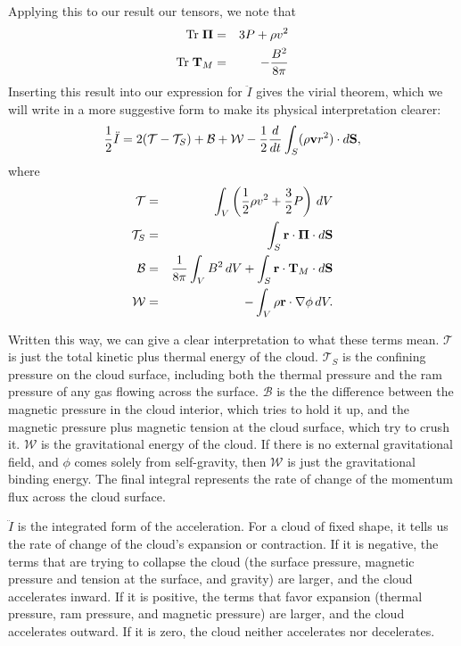 Applying this to our result our tensors, we note that
\begin{eqnarray}
\mbox{Tr}\; \boldsymbol{\Pi} & = & 3P + \rho v^2 \\
\mbox{Tr}\; \mathbf{T}_M & = & -\frac{B^2}{8\pi}
\end{eqnarray}
Inserting this result into our expression for $\ddot{I}$ gives the virial theorem, which we will write in a more suggestive form to make its physical interpretation clearer:
\begin{equation}
\frac{1}{2}\ddot{I} = 2(\mathcal{T} - \mathcal{T}_S) + \mathcal{B} + \mathcal{W} - \frac{1}{2}\frac{d}{dt} \int_S (\rho\mathbf{v} r^2)\cdot d\mathbf{S},
\end{equation}
where
\begin{eqnarray}
\mathcal{T} & = & \int_V\left(\frac{1}{2}\rho v^2 + \frac{3}{2} P\right)\, dV \\
\mathcal{T}_S & = & \int_S \mathbf{r} \cdot \boldsymbol{\Pi} \cdot d\mathbf{S}\\
\mathcal{B} & = & \frac{1}{8\pi} \int_V B^2 \,dV + \int_S \mathbf{r}\cdot \mathbf{T}_M\cdot d\mathbf{S}\\
\mathcal{W} & = & -\int_V \rho \mathbf{r}\cdot\nabla\phi\,dV.
\end{eqnarray}

Written this way, we can give a clear interpretation to what these terms mean. $\mathcal{T}$ is just the total kinetic plus thermal energy of the cloud. $\mathcal{T}_S$ is the confining pressure on the cloud surface, including both the thermal pressure and the ram pressure of any gas flowing across the surface. $\mathcal{B}$ is the the difference between the magnetic pressure in the cloud interior, which tries to hold it up, and the magnetic pressure plus magnetic tension at the cloud surface, which try to crush it. $\mathcal{W}$ is the gravitational energy of the cloud. If there is no external gravitational field, and $\phi$ comes solely from self-gravity, then $\mathcal{W}$ is just the gravitational binding energy. The final integral represents the rate of change of the momentum flux across the cloud surface.

$\ddot{I}$ is the integrated form of the acceleration. For a cloud of fixed shape, it tells us the rate of change of the cloud's expansion or contraction. If it is negative, the terms that are trying to collapse the cloud (the surface pressure, magnetic pressure and tension at the surface, and gravity) are larger, and the cloud accelerates inward. If it is positive, the terms that favor expansion (thermal pressure, ram pressure, and magnetic pressure) are larger, and the cloud accelerates outward. If it is zero, the cloud neither accelerates nor decelerates.

